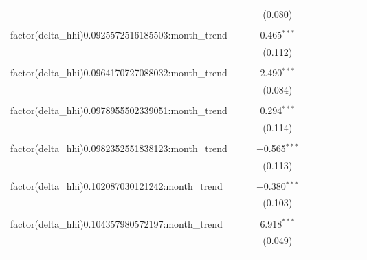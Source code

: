 \begin{table}[H]
{\begin{tabular}{@{\extracolsep{5pt}}lccccccccc}
   &  &  & (0.080) &  &  &  &  &  &  \\  

   & & & & & & & & & \\  

  factor(delta\_hhi)0.0925572516185503:month\_trend &  &  & 0.465$^{***}$ &  &  &  &  &  &  \\  

   &  &  & (0.112) &  &  &  &  &  &  \\  

   & & & & & & & & & \\  

  factor(delta\_hhi)0.0964170727088032:month\_trend &  &  & 2.490$^{***}$ &  &  &  &  &  &  \\  

   &  &  & (0.084) &  &  &  &  &  &  \\  

   & & & & & & & & & \\  

  factor(delta\_hhi)0.0978955502339051:month\_trend &  &  & 0.294$^{***}$ &  &  &  &  &  &  \\  

   &  &  & (0.114) &  &  &  &  &  &  \\  

   & & & & & & & & & \\  

  factor(delta\_hhi)0.0982352551838123:month\_trend &  &  & $-$0.565$^{***}$ &  &  &  &  &  &  \\  

   &  &  & (0.113) &  &  &  &  &  &  \\  

   & & & & & & & & & \\  

  factor(delta\_hhi)0.102087030121242:month\_trend &  &  & $-$0.380$^{***}$ &  &  &  &  &  &  \\  

   &  &  & (0.103) &  &  &  &  &  &  \\  

   & & & & & & & & & \\  

  factor(delta\_hhi)0.104357980572197:month\_trend &  &  & 6.918$^{***}$ &  &  &  &  &  &  \\  

   &  &  & (0.049) &  &  &  &  &  &  \\  

   & & & & & & & & & \\  


\end{tabular}}
\end{table}
